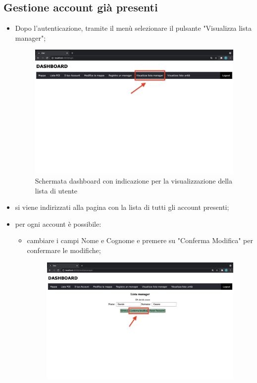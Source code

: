 \subsection{Gestione account già presenti}
\begin{itemize}
    \item Dopo l'autenticazione, tramite il menù selezionare il pulsante "Visualizza lista manager";
    \begin{figure}[H]
        \centering
        \includegraphics[scale=0.12]{res/images/dashboard5.png}
        \caption{Schermata dashboard con indicazione per la visualizzazione della lista di utente}
    \end{figure}
    \item si viene indirizzati alla pagina con la lista di tutti gli account presenti;
    \item per ogni account è possibile:
        \begin{itemize}
            \item cambiare i campi Nome e Cognome e premere su "Conferma Modifica" per confermare le modifiche;
            \begin{figure}[H]
                \centering
                \includegraphics[scale=0.12]{res/images/modificamanager.png}

\end{figure}
\end{itemize}
\end{itemize}
